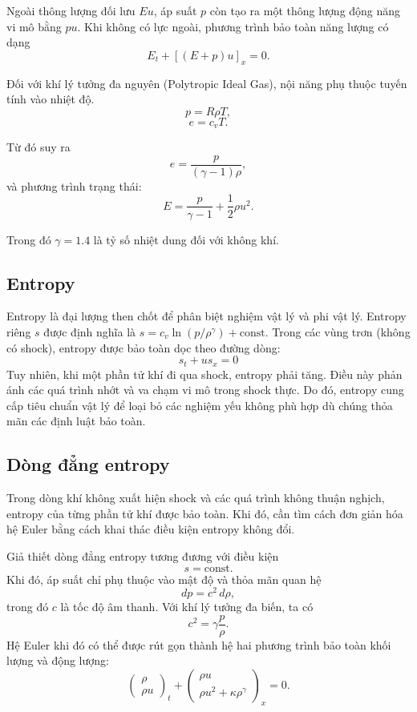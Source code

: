 Ngoài thông lượng đối lưu $Eu$, áp suất $p$ còn tạo ra một thông lượng động năng vi mô bằng $pu$. Khi không có lực ngoài, phương trình bảo toàn năng lượng có dạng
\begin{equation*}
E_t + [(E+p)u]_x = 0.
\end{equation*}

Đối với khí lý tưởng đa nguyên (Polytropic Ideal Gas), nội năng phụ thuộc tuyến tính vào nhiệt độ.
\begin{equation*}
p = R\rho T,
\end{equation*}
\begin{equation*}
e = c_v T.
\end{equation*}

Từ đó suy ra
\begin{equation*}
e = \frac{p}{(\gamma - 1)\rho},
\end{equation*}
và phương trình trạng thái:
\begin{equation*}
E = \frac{p}{\gamma - 1} + \frac12 \rho u^2.
\end{equation*}

Trong đó $\gamma = 1.4$ là tỷ số nhiệt dung đối với không khí.

\subsection{Entropy}
Entropy là đại lượng then chốt để phân biệt nghiệm vật lý và phi vật lý. Entropy riêng $s$ được định nghĩa là $s = c_v \ln(p/\rho^\gamma) + \text{const}$. Trong các vùng trơn (không có shock), entropy được bảo toàn dọc theo đường dòng:
\begin{equation*}
    s_t + u s_x = 0
\end{equation*}
Tuy nhiên, khi một phần tử khí đi qua shock, entropy phải tăng. Điều này phản ánh các quá trình nhớt và va chạm vi mô trong shock thực. Do đó, entropy cung cấp tiêu chuẩn vật lý để loại bỏ các nghiệm yếu không phù hợp dù chúng thỏa mãn các định luật bảo toàn.

\subsection{Dòng đẳng entropy}
Trong dòng khí không xuất hiện shock và các quá trình không thuận nghịch, entropy của từng phần tử khí được bảo toàn. Khi đó, cần tìm cách đơn giản hóa hệ Euler bằng cách khai thác điều kiện entropy không đổi.


Giả thiết dòng đẳng entropy tương đương với điều kiện
\[
s = \text{const}.
\]
Khi đó, áp suất chỉ phụ thuộc vào mật độ và thỏa mãn quan hệ
\[
dp = c^2\, d\rho,
\]
trong đó $c$ là tốc độ âm thanh. Với khí lý tưởng đa biến, ta có
\[
c^2 = \gamma \frac{p}{\rho}.
\]
Hệ Euler khi đó có thể được rút gọn thành hệ hai phương trình bảo toàn khối lượng và động lượng:
\[
\begin{pmatrix}
\rho \\
\rho u
\end{pmatrix}_t
+
\begin{pmatrix}
\rho u \\
\rho u^2 + \kappa \rho^\gamma
\end{pmatrix}_x
= 0.
\]

